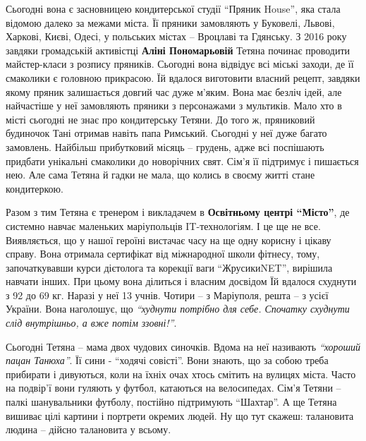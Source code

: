 Сьогодні вона є засновницею кондитерської студії \enquote{Пряник House}, яка стала
відомою далеко за межами міста. Її пряники замовляють у Буковелі, Львові,
Харкові, Києві, Одесі, у польських містах – Вроцлаві та Гдянську. З 2016 року
завдяки громадській активістці \textbf{Аліні Пономарьовій} Тетяна починає проводити
майстер-класи з розпису пряників. Сьогодні вона відвідує всі міські заходи, де
її смаколики є головною прикрасою. Їй вдалося виготовити власний рецепт,
завдяки якому пряник залишається довгий час дуже м'яким. Вона має безліч ідей,
але найчастіше у неї замовляють пряники з персонажами з мультиків. Мало хто в
місті сьогодні не знає про кондитерську Тетяни. До того ж, пряниковий будиночок
Тані отримав навіть папа Римський. Сьогодні у неї дуже багато замовлень.
Найбільш прибутковий місяць – грудень, адже всі поспішають придбати унікальні
смаколики до новорічних свят. Сім'я її підтримує і пишається нею. Але сама
Тетяна й гадки не мала, що колись в своєму житті стане кондитеркою.


Разом з тим Тетяна є тренером і викладачем в \textbf{Освітньому центрі \enquote{Місто}}, де
системно навчає маленьких маріупольців IT-технологіям. І це ще не все.
Виявляється, що у нашої героїні вистачає часу на ще одну корисну і цікаву
справу. Вона отримала сертифікат від міжнародної школи фітнесу, тому,
започаткувавши курси дієтолога та корекції ваги \enquote{ЖрусикиNET}, вирішила навчати
інших. При цьому вона ділиться і власним досвідом Їй вдалося схуднути з 92 до
69 кг. Наразі у неї 13 учнів. Чотири – з Маріуполя, решта – з усієї України.
Вона наголошує, що \emph{\enquote{худнути потрібно для себе. Спочатку схуднути слід
внутрішньо, а вже потім ззовні!}}.



Сьогодні Тетяна – мама двох чудових синочків. Вдома на неї називають \emph{\enquote{хороший
пацан Танюха}}. Її сини - \enquote{ходячі совісті}. Вони знають, що за собою треба
прибирати і дивуються, коли на їхніх очах хтось смітить на вулицях міста. Часто
на подвір'ї вони гуляють у футбол, катаються на велосипедах. Сім'я Тетяни –
палкі шанувальники футболу, постійно підтримують \enquote{Шахтар}. А ще Тетяна вишиває
цілі картини і портрети окремих людей. Ну що тут скажеш: талановита людина –
дійсно талановита у всьому.

